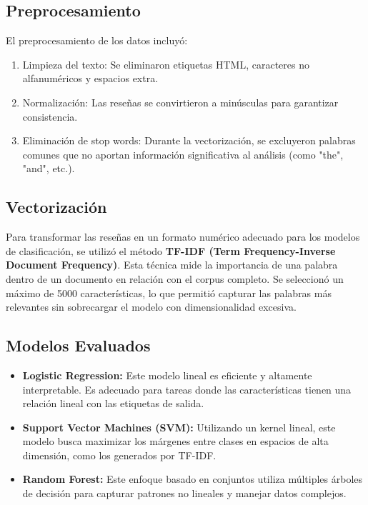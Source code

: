 \documentclass[conference]{IEEEtran}
\begin{document}
\subsection{Preprocesamiento}

El preprocesamiento de los datos incluyó:

\begin{enumerate}
    \item Limpieza del texto: Se eliminaron etiquetas HTML, caracteres no alfanuméricos y espacios extra.
    
    \item Normalización: Las reseñas se convirtieron a minúsculas para garantizar consistencia.
    
    \item Eliminación de stop words: Durante la vectorización, se excluyeron palabras comunes que no aportan información significativa al análisis (como "the", "and", etc.).
\end{enumerate}


\subsection{Vectorización}

Para transformar las reseñas en un formato numérico adecuado para los modelos de clasificación, se utilizó el método \textbf{TF-IDF (Term Frequency-Inverse Document Frequency)}. Esta técnica mide la importancia de una palabra dentro de un documento en relación con el corpus completo. Se seleccionó un máximo de 5000 características, lo que permitió capturar las palabras más relevantes sin sobrecargar el modelo con dimensionalidad excesiva.


\subsection{Modelos Evaluados}

\begin{itemize}
    \item \textbf{Logistic Regression:} Este modelo lineal es eficiente y altamente interpretable. Es adecuado para tareas donde las características tienen una relación lineal con las etiquetas de salida.
    
    \item \textbf{Support Vector Machines (SVM):} Utilizando un kernel lineal, este modelo busca maximizar los márgenes entre clases en espacios de alta dimensión, como los generados por TF-IDF.
    
    \item \textbf{Random Forest:} Este enfoque basado en conjuntos utiliza múltiples árboles de decisión para capturar patrones no lineales y manejar datos complejos.
\end{itemize}
\end{document}
